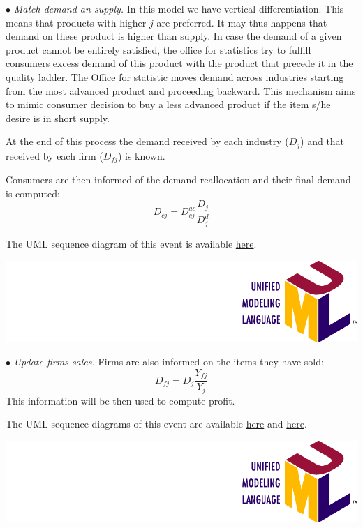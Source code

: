 \documentclass{book}
\newcommand{\umllocation}{file:///Users/giulioni/Dropbox/svn/sfcabm_my/documentation}
\begin{document}
\noindent$\bullet$ \textit{Match demand an supply.} In this model we have vertical differentiation. This means that products with higher $j$ are preferred. It may thus happens that demand on these product is higher than supply. 
In case the demand of a given product cannot be entirely satisfied, the office for statistics try to fulfill consumers excess demand of this product with the product that precede it in the quality ladder. The Office for statistic moves demand across industries starting from the most advanced product and proceeding backward. 
This mechanism aims to mimic consumer decision to buy a less advanced product if the item s/he desire is in short supply.

At the end of this process the demand received by each industry ($D_j$) and that received by each firm ($D_{fj}$) is known.

Consumers are then informed of the demand reallocation and their final demand is computed:
\[
	D_{cj}=D_{cj}^{ac}\frac{D_j}{D_j^d}
\]


The UML sequence diagram of this event is available \href{\umllocation/matchDemandAndSupply.html}{here}.
\begin{marginfigure}
	\includegraphics[scale=0.1]{uml.png}
\end{marginfigure}


\noindent$\bullet$ \textit{Update firms sales.}
Firms are also informed on the items they have sold:
\[
	D_{fj}=D_j \frac{Y_{fj}}{Y_j}
\]
This information will be then used to compute profit.

The UML sequence diagrams of this event are available \href{\umllocation/computeDemand.html}{here} and \href{\umllocation/allocateDemand.html}{here}.
\begin{marginfigure}
	\includegraphics[scale=0.1]{uml.png}
\end{marginfigure}
\end{document}
